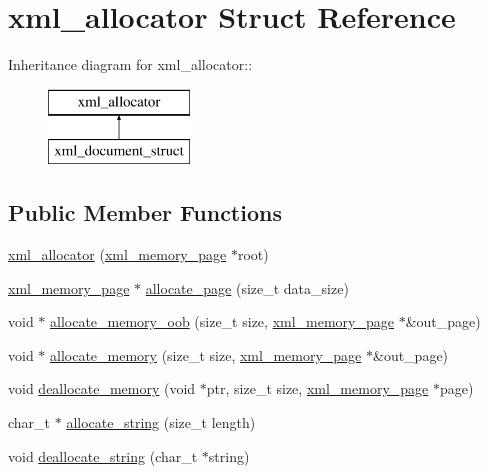 \hypertarget{structxml__allocator}{
\section{xml\_\-allocator Struct Reference}
\label{structxml__allocator}
}
Inheritance diagram for xml\_\-allocator::\begin{figure}[H]
\begin{center}
\leavevmode
\includegraphics[height=2cm]{structxml__allocator}
\end{center}
\end{figure}
\subsection*{Public Member Functions}
\begin{CompactItemize}
\item 
\hyperlink{structxml__allocator_d41b1a18595953aa71a470b45921c0fd}{xml\_\-allocator} (\hyperlink{structxml__memory__page}{xml\_\-memory\_\-page} $\ast$root)
\item 
\hyperlink{structxml__memory__page}{xml\_\-memory\_\-page} $\ast$ \hyperlink{structxml__allocator_4b399b01e530220ec5849b912b84063b}{allocate\_\-page} (size\_\-t data\_\-size)
\item 
void $\ast$ \hyperlink{structxml__allocator_30bb557bc040de54c041c6d3dca6772e}{allocate\_\-memory\_\-oob} (size\_\-t size, \hyperlink{structxml__memory__page}{xml\_\-memory\_\-page} $\ast$\&out\_\-page)
\item 
void $\ast$ \hyperlink{structxml__allocator_fac0b9fac2c2962972f60d0346eb4f39}{allocate\_\-memory} (size\_\-t size, \hyperlink{structxml__memory__page}{xml\_\-memory\_\-page} $\ast$\&out\_\-page)
\item 
void \hyperlink{structxml__allocator_5df417155487cce4e0460b123ac33dc6}{deallocate\_\-memory} (void $\ast$ptr, size\_\-t size, \hyperlink{structxml__memory__page}{xml\_\-memory\_\-page} $\ast$page)
\item 
char\_\-t $\ast$ \hyperlink{structxml__allocator_c5ec2b5d41672d6494a2742e95e525b3}{allocate\_\-string} (size\_\-t length)
\item 
void \hyperlink{structxml__allocator_f32c538db4d562c2d0bfe15f7c0aa879}{deallocate\_\-string} (char\_\-t $\ast$string)
\end{CompactItemize}
